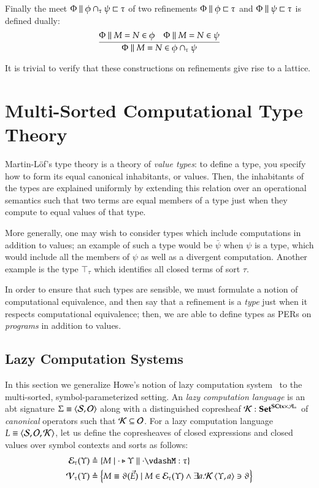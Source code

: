 \documentclass[11pt]{article}
\theoremstyle{definition}
\theoremstyle{remark}
\numberwithin{equation}{section}
\def\IModeColorName{MidnightBlue}
\def\OModeColorName{Maroon}
\def\IModeColorName{Black}
\def\OModeColorName{Black}
\newcommand\IMode[1]{{\color{\IModeColorName}{#1}}}
\newcommand\OMode[1]{{\color{\OModeColorName}{#1}}}
\newcommand\MkSet[1]{\left\{#1\right\}}
\newcommand\Of[2]{\IMode{#1}: \IMode{#2}}
\newcommand\Match[2]{\IMode{#1}\equiv\OMode{#2}}
\newcommand\Sorts{\mathcal{S}}
\newcommand\Arities{\mathcal{A}}
\newcommand\Operators{\mathcal{O}}
\newcommand\CanOperators{\mathcal{K}}
\newcommand\Discrete[1]{#1_{\equiv}}
\newcommand\Sets{\mathbf{Set}}
\newcommand\SCtx{\mathbf{SCtx}}
\newcommand\Pair[2]{\left\langle#1, #2 \right\rangle}
\newcommand\Tuple[1]{\left\langle#1 \right\rangle}
\newcommand\IsAbtUnmoded[5]{
  #1\triangleright%
  #2\parallel%
  #3\vdash%
  #4:\OMode{#5}%
}
\newcommand\App[2]{#1(#2)}
\newcommand\IsSubsetEq[2]{\IMode{#1}\subseteq\IMode{#2}}
\newcommand\ADefine[2]{\IMode{#1}&\triangleq\OMode{#2}}
\newcommand\Refines[3]{\IMode{#1}\parallel\IMode{#2}\sqsubset\OMode{#3}}
\newcommand\RMemEq[4]{\IMode{#1}\parallel\IMode{#2}=\IMode{#3}\in\IMode{#4}}
\newcommand\TyTop[1]{\top_{#1}}
\newcommand\TyMeet[1]{\cap_{#1}}
\newcommand\Exprs{\mathcal{E}}
\newcommand\Values{\mathcal{V}}
\begin{document}
Finally the meet $\Refines{\Phi}{\phi\TyMeet{\tau}\psi}{\tau}$ of two refinements
$\Refines{\Phi}{\phi}{\tau}$ and $\Refines{\Phi}{\psi}{\tau}$ is defined
dually:
\[
  \infer{
    \RMemEq{\Phi}{M}{N}{\phi\TyMeet{\tau}\psi}
  }{
    \RMemEq{\Phi}{M}{N}{\phi} &
    \RMemEq{\Phi}{M}{N}{\psi}
  }
\]

It is trivial to verify that these constructions on refinements give rise to a
lattice.

\section{Multi-Sorted Computational Type Theory}

Martin-L\"of's type theory is a theory of \emph{value types}: to define a type,
you specify how to form its equal canonical inhabitants, or values. Then, the
inhabitants of the types are explained uniformly by extending this relation
over an operational semantics such that two terms are equal members of a
type just when they compute to equal values of that type.

More generally, one may wish to consider types which include computations in
addition to values; an example of such a type would be $\bar{\psi}$ when $\psi$
is a type, which would include all the members of $\psi$ as well as a divergent
computation. Another example is the type $\TyTop{\tau}$ which identifies all
closed terms of sort $\tau$.

In order to ensure that such types are sensible, we must formulate a notion of
computational equivalence, and then say that a refinement is a \emph{type} just
when it respects computational equivalence; then, we are able to define types
as PERs on \emph{programs} in addition to values.


\subsection{Lazy Computation Systems}

In this section we generalize Howe's notion of lazy computation
system~\cite{howe:1989} to the multi-sorted, symbol-parameterized setting. An
\emph{lazy computation language} is an abt signature
$\Match{\Sigma}{\Pair{\Sorts}{\Operators}}$ along with a distinguished copresheaf
$\Of{\CanOperators}{\Sets^{\SCtx\times\Discrete{\Arities}}}$ of
\emph{canonical} operators such that $\IsSubsetEq{\CanOperators}{\Operators}$.
For a lazy computation language
$\Match{L}{\Tuple{\Sorts,\Operators,\CanOperators}}$, let us define the
copresheaves of closed expressions and closed values over symbol contexts and sorts as
follows:
\begin{align*}
  \ADefine{\Exprs_\tau(\Upsilon)}{
    \MkSet{M \mid \IsAbtUnmoded{\cdot}{\Upsilon}{\cdot}{M}{\tau}}
  }\\
  \ADefine{\Values_\tau(\Upsilon)}{
    \MkSet{
      M\equiv\App{\vartheta}{\vec{E}}
      \mid M\in\Exprs_\tau(\Upsilon)\land \exists a. \CanOperators\Pair{\Upsilon}{a}\ni\vartheta
    }
  }
\end{align*}
\end{document}
